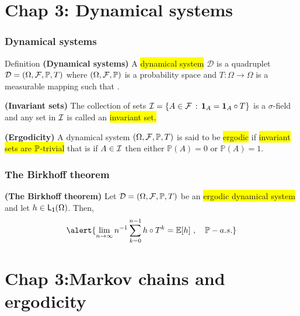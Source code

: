 \documentclass[usenames,dvipsnames]{beamer}
\newcommand\colbox[1]{\colorbox{Yellow}{#1}}
\begin{document}
\section{Chap 3: Dynamical systems}
\begin{frame}
  \frametitle{Dynamical systems}
  \begin{block}{Definition}
    \textbf{(Dynamical systems)}
    A \colbox{dynamical system} $\mathcal{D}$
is a quadruplet $\mathcal{D}=(\Omega,\mathcal{F},\mathbb{P},T)$ where $(\Omega,\mathcal{F},\mathbb{P})$
is a probability space and $T:\Omega\rightarrow\Omega$ is a measurable
mapping such that .
  \end{block}
\pause
  \begin{lemma} \textbf{(Invariant sets)}
    The collection of sets $\mathcal{I}=\left\{ A\in\mathcal{F}\,:\,\mathbf{1}_{A}=\mathbf{1}_{A}\circ T\right\}$
    is a $\sigma$-field and any set in $\mathcal{I}$ is called an \colbox{invariant set.} 
    \end{lemma}
    \pause    
    \begin{definition}
      \textbf{(Ergodicity)}  A dynamical system $(\Omega,\mathcal{F},\mathbb{P},T)$
      is said to be \colbox{ergodic} if \colbox{invariant sets are $\mathbb{P}$-trivial} that is if $A\in\mathcal{I}$
      then either $\mathbb{P}(A)=0$ or $\mathbb{P}(A)=1$.
      \end{definition}
      
\end{frame}

\begin{frame}
  \frametitle{The Birkhoff theorem}
  \begin{theorem}
    \textbf{\label{thm:birk:dynam}(The Birkhoff theorem)} Let $\mathcal{D}=(\Omega,\mathcal{F},\mathbb{P},T)$
    be an \colbox{ergodic dynamical system} and let $h\in\mathsf{L_{1}}(\Omega)$.
    Then,
    \[
    \alert{\lim_{n\to\infty}n^{-1}\sum_{k=0}^{n-1}h\circ T^{k}=\PE[h]\ ,\quad\PP-a.s.}
    \]
    \end{theorem}
    \end{frame}


    
    \section{Chap 3:Markov chains and ergodicity}
\end{document}
